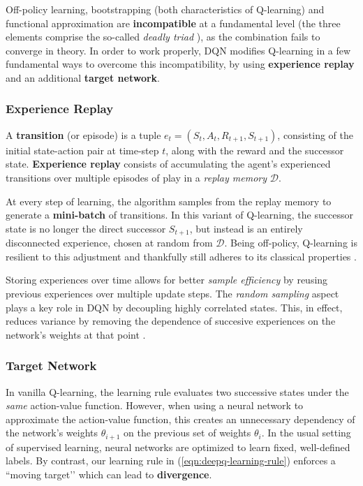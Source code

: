 Off-policy learning, bootstrapping (both characteristics of Q-learning) and functional approximation are \textbf{incompatible} at a fundamental level (the three elements comprise the so-called \emph{deadly triad} \cite{rlai}), as the combination fails to converge in theory.
In order to work properly, DQN modifies Q-learning in a few fundamental ways to overcome this incompatibility, by using \textbf{experience replay} and an additional \textbf{target network}.

\subsubsection{Experience Replay}

A \textbf{transition} (or episode) is a tuple $e_t = (S_t, A_t, R_{t+1}, S_{t+1})$, consisting of the initial state-action pair at time-step $t$, along with the reward and the successor state.
\textbf{Experience replay} consists of accumulating the agent's experienced transitions over multiple episodes of play in a \emph{replay memory} $\mathcal{D}$.

At every step of learning, the algorithm samples from the replay memory to generate a \textbf{mini-batch} of transitions.
In this variant of Q-learning, the successor state is no longer the direct successor $S_{t+1}$, but instead is an entirely disconnected experience, chosen at random from $\mathcal{D}$.
Being off-policy, Q-learning is resilient to this adjustment and thankfully still adheres to its classical properties \cite{rlai}.

Storing experiences over time allows for better \emph{sample efficiency} by reusing previous experiences over multiple update steps.
The \emph{random sampling} aspect plays a key role in DQN by decoupling highly correlated states.
This, in effect, reduces variance by removing the dependence of succesive experiences on the network's weights at that point \cite{rlai}.

\subsubsection{Target Network}

In vanilla Q-learning, the learning rule evaluates two successive states under the \emph{same} action-value function.
However, when using a neural network to approximate the action-value function, this creates an unnecessary dependency of the network's weights $\theta_{i+1}$ on the previous set of weights $\theta_{i}$.
In the usual setting of supervised learning, neural networks are optimized to learn fixed, well-defined labels.
By contrast, our learning rule in (\ref{eqn:deepq-learning-rule}) enforces a ``moving target’’ which can lead to \textbf{divergence}.

